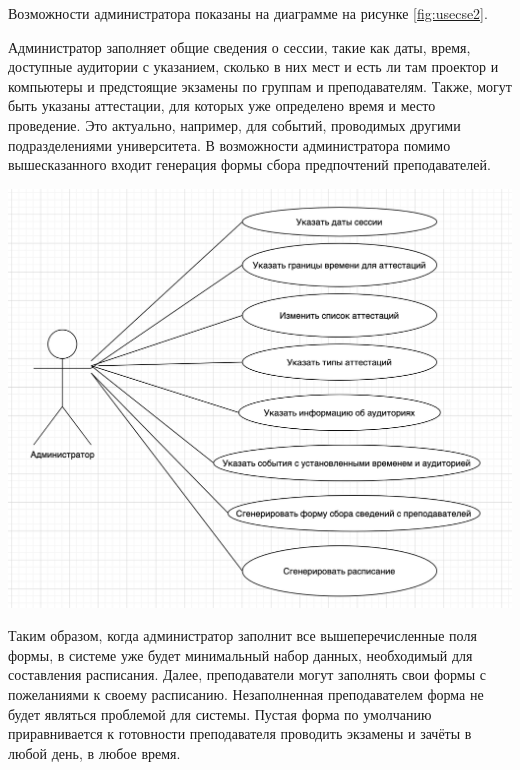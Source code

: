 Возможности администратора показаны на диаграмме на рисунке \ref{fig:usecse2}.

Администратор заполняет общие сведения о сессии, такие как даты, время, доступные аудитории с указанием, сколько в них мест и есть ли там проектор и компьютеры и предстоящие экзамены по группам и преподавателям. Также, могут быть указаны аттестации, для которых уже определено время и место проведение. Это актуально, например, для событий, проводимых другими подразделениями университета. В возможности администратора помимо вышесказанного входит генерация формы сбора предпочтений преподавателей. 

\begin{minipage}{\textwidth}
	\centering
	\vspace{\mfloatsep} %
	\includegraphics[keepaspectratio=true,scale=0.6] {my_folder/images//usecase2}
	\label{fig:usecse2}  
	\vspace{\mfloatsep} %
\end{minipage}

Таким образом, когда администратор заполнит все вышеперечисленные поля формы, в системе уже будет минимальный набор данных, необходимый для составления расписания. 
Далее, преподаватели могут заполнять свои формы с пожеланиями к своему расписанию. Незаполненная преподавателем форма не будет являться проблемой для системы. Пустая форма по умолчанию приравнивается к готовности преподавателя проводить экзамены и зачёты в любой день, в любое время. 

